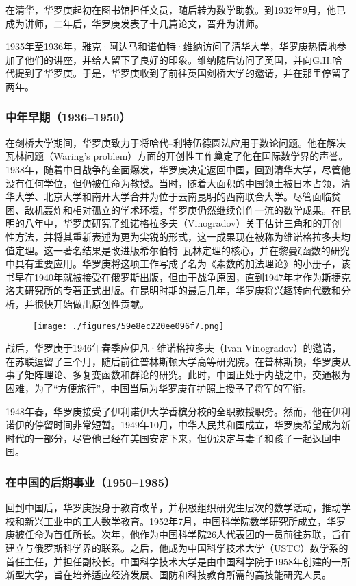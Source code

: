 在清华，华罗庚起初在图书馆担任文员，随后转为数学助教。到1932年9月，他已成为讲师，二年后，华罗庚发表了十几篇论文，晋升为讲师。

1935年至1936年，雅克·阿达马和诺伯特·维纳访问了清华大学，华罗庚热情地参加了他们的讲座，并给人留下了良好的印象。维纳随后访问了英国，并向G.H.哈代提到了华罗庚。于是，华罗庚收到了前往英国剑桥大学的邀请，并在那里停留了两年。
\subsubsection{中年早期（1936–1950）}  
在剑桥大学期间，华罗庚致力于将哈代–利特伍德圆法应用于数论问题。他在解决瓦林问题（Waring's problem）方面的开创性工作奠定了他在国际数学界的声誉。1938年，随着中日战争的全面爆发，华罗庚决定返回中国，回到清华大学，尽管他没有任何学位，但仍被任命为教授。当时，随着大面积的中国领土被日本占领，清华大学、北京大学和南开大学合并为位于云南昆明的西南联合大学。尽管面临贫困、敌机轰炸和相对孤立的学术环境，华罗庚仍然继续创作一流的数学成果。在昆明的八年中，华罗庚研究了维诺格拉多夫（Vinogradov）关于估计三角和的开创性方法，并将其重新表述为更为尖锐的形式，这一成果现在被称为维诺格拉多夫均值定理。这一著名结果是改进版希尔伯特–瓦林定理的核心，并在黎曼ζ函数的研究中具有重要应用。华罗庚将这项工作写成了名为《素数的加法理论》的小册子，该书早在1940年就被接受在俄罗斯出版，但由于战争原因，直到1947年才作为斯捷克洛夫研究所的专著正式出版。在昆明时期的最后几年，华罗庚将兴趣转向代数和分析，并很快开始做出原创性贡献。
\begin{figure}[ht]
\centering
\texttt{[image: ./figures/59e8ec220ee096f7.png]}
\caption{} \label{fig_Luogen_2}
\end{figure}
战后，华罗庚于1946年春季应伊凡·维诺格拉多夫（Ivan Vinogradov）的邀请，在苏联逗留了三个月，随后前往普林斯顿大学高等研究院。在普林斯顿，华罗庚从事了矩阵理论、多复变函数和群论的研究。此时，中国正处于内战之中，交通极为困难，为了“方便旅行”，中国当局为华罗庚在护照上授予了将军的军衔。

1948年春，华罗庚接受了伊利诺伊大学香槟分校的全职教授职务。然而，他在伊利诺伊的停留时间非常短暂。1949年10月，中华人民共和国成立，华罗庚希望成为新时代的一部分，尽管他已经在美国安定下来，但仍决定与妻子和孩子一起返回中国。
\subsubsection{在中国的后期事业（1950–1985）}  
回到中国后，华罗庚投身于教育改革，并积极组织研究生层次的数学活动，推动学校和新兴工业中的工人数学教育。1952年7月，中国科学院数学研究所成立，华罗庚被任命为首任所长。次年，他作为中国科学院26人代表团的一员前往苏联，旨在建立与俄罗斯科学界的联系。之后，他成为中国科学技术大学（USTC）数学系的首任主任，并担任副校长。中国科学技术大学是由中国科学院于1958年创建的一所新型大学，旨在培养适应经济发展、国防和科技教育所需的高技能研究人员。

